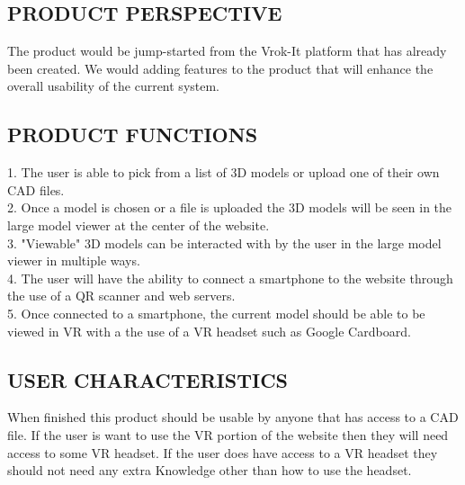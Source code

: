 \documentclass[letterpaper, 10pt, draftclsnofoot, compsoc, onecolumn]{IEEEtran}
\begin{document}
\subsection[PRODUCT
PERSPECTIVE]{\rmfamily\bfseries\color{black}
PRODUCT PERSPECTIVE}
{\color{black}

{\color{black}
The product would be jump-started from the Vrok-It platform that has already been created. We would adding features to the product that will enhance the overall usability of the current system.    }

\subsection[PRODUCT
FUNCTIONS]{\rmfamily\bfseries\color{black}
PRODUCT FUNCTIONS}

{\color{black}

1. The user is able to pick from a list of 3D models or upload one of their own CAD files. \\

2. Once a model is chosen or a file is uploaded the 3D models will be seen in the large model viewer at the 
	center of the website.\\

3. "Viewable" 3D models can be interacted with by the user in the large model viewer in multiple ways.\\

4. The user will have the ability to connect a smartphone to the website through the use of a QR scanner
	and web servers. \\

5. Once connected to a smartphone, the current model should be able to be viewed in VR with a the use
	of a VR headset such as Google Cardboard. \\
}

\subsection[USER
CHARACTERISTICS]{\rmfamily\bfseries\color{black}
USER CHARACTERISTICS}

{\color{black}
When finished this product should be usable by anyone that has access to a CAD file. If the user is want to use the VR 
portion of the website then they will need access to some VR headset. If the user does have access to a VR headset they 
should not need any extra Knowledge other than how to use the headset.  }


}
\end{document}

